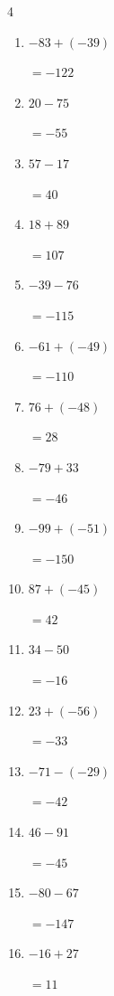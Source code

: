 \begin{multicols}{4}
\begin{enumerate}
        $=105$

  \item $-83+(-39)$

        $=-122$

  \item $20-75$

        $=-55$

  \item $57-17$

        $=40$

  \item $18+89$

        $=107$

  \item $-39-76$

        $=-115$

\columnbreak %

\resetques

  \item $-61+(-49)$

        $=-110$

  \item $76+(-48)$

        $=28$

  \item $-79+33$

        $=-46$

  \item $-99+(-51)$

        $=-150$

  \item $87+(-45)$

        $=42$

  \item $34-50$

        $=-16$

  \item $23+(-56)$

        $=-33$

  \item $-71-(-29)$

        $=-42$

  \item $46-91$

        $=-45$

  \item $-80-67$

        $=-147$

  \item $-16+27$

        $=11$


\end{enumerate}
\end{multicols}
